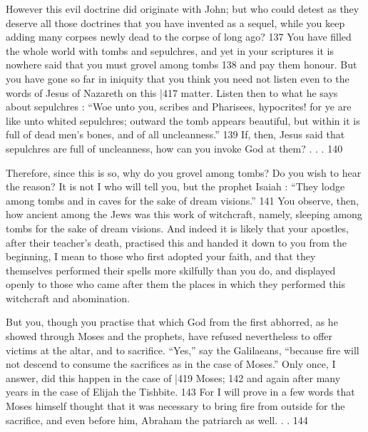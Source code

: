 However this evil doctrine did originate with John; but who could detest as they deserve all those doctrines that you have invented as a sequel, while you keep adding many corpses newly dead to the corpse of long ago?
137 You have filled the whole world with tombs and sepulchres, and yet in your scriptures it is nowhere said that you must grovel among tombs
138 and pay them honour. But you have gone so far in iniquity that you think you need not listen even to the words of Jesus of Nazareth on this
|417 matter. Listen then to what he says about sepulchres : ``Woe unto you, scribes and Pharisees, hypocrites! for ye are like unto whited sepulchres; outward the tomb appears beautiful, but within it is full of dead men's bones, and of all uncleanness.''
139 If, then, Jesus said that sepulchres are full of uncleanness, how can you invoke God at them? . . . 140

Therefore, since this is so, why do you grovel among tombs? Do you wish to hear the reason? It is not I who will tell you, but the prophet Isaiah : ``They lodge among tombs and in caves for the sake of dream visions.''
141 You observe, then, how ancient among the Jews was this work of witchcraft, namely, sleeping among tombs for the sake of dream visions. And indeed it is likely that your apostles, after their teacher's death, practised this and handed it down to you from the beginning, I mean to those who first adopted your faith, and that they themselves performed their spells more skilfully than you do, and displayed openly to those who came after them the places in which they performed this witchcraft and abomination.

But you, though you practise that which God from the first abhorred, as he showed through Moses and the prophets, have refused nevertheless to offer victims at the altar, and to sacrifice. ``Yes,'' say the Galilaeans, ``because fire will not descend to consume the sacrifices as in the case of Moses.'' Only once, I answer, did this happen in the case of
|419 Moses; 142 \emph{}and again after many years in the case of Elijah the Tishbite. 143 For I will prove in a few words that Moses himself thought that it was necessary to bring fire from outside for the sacrifice, and even before him, Abraham the patriarch as well. . .
144

